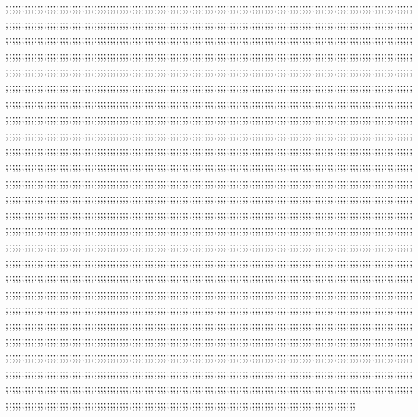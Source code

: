 ;;;;;;;;;;;;;;;;;;;;;;;;;;;;;;;;;;;;;;;;;;;;;;;;;;;;;;;;;;;;;;;;;;;;;;;;;;;;;;;;;;;;;;;;;;;;;;;;;;;;;;;;;;;;;;;;;;;;;;;;;;;;;;;;;;;;;;;;;;;;;;;;;;;;;;;;;;;;;;;;;;;;;;;;;;;;;;;;;;;;;;;;;;;;;;;;;;;;;;;;;;;;;;;;;;;;;;;;;;;;;;;;;;;;;;;;;;;;;;;;;;;;;;;;;;;;;;;;;;;;;;;;;;;;;;;;;;;;;;;;;;;;;;;;;;;;;;;;;;;;;;;;;;;;;;;;;;;;;;;;;;;;;;;;;;;;;;;;;;;;;;;;;;;;;;;;;;;;;;;;;;;;;;;;;;;;;;;;;;;;;;;;;;;;;;;;;;;;;;;;;;;;;;;;;;;;;;;;;;;;;;;;;;;;;;;;;;;;;;;;;;;;;;;;;;;;;;;;;;;;;;;;;;;;;;;;;;;;;;;;;;;;;;;;;;;;;;;;;;;;;;;;;;;;;;;;;;;;;;;;;;;;;;;;;;;;;;;;;;;;;;;;;;;;;;;;;;;;;;;;;;;;;;;;;;;;;;;;;;;;;;;;;;;;;;;;;;;;;;;;;;;;;;;;;;;;;;;;;;;;;;;;;;;;;;;;;;;;;;;;;;;;;;;;;;;;;;;;;;;;;;;;;;;;;;;;;;;;;;;;;;;;;;;;;;;;;;;;;;;;;;;;;;;;;;;;;;;;;;;;;;;;;;;;;;;;;;;;;;;;;;;;;;;;;;;;;;;;;;;;;;;;;;;;;;;;;;;;;;;;;;;;;;;;;;;;;;;;;;;;;;;;;;;;;;;;;;;;;;;;;;;;;;;;;;;;;;;;;;;;;;;;;;;;;;;;;;;;;;;;;;;;;;;;;;;;;;;;;;;;;;;;;;;;;;;;;;;;;;;;;;;;;;;;;;;;;;;;;;;;;;;;;;;;;;;;;;;;;;;;;;;;;;;;;;;;;;;;;;;;;;;;;;;;;;;;;;;;;;;;;;;;;;;;;;;;;;;;;;;;;;;;;;;;;;;;;;;;;;;;;;;;;;;;;;;;;;;;;;;;;;;;;;;;;;;;;;;;;;;;;;;;;;;;;;;;;;;;;;;;;;;;;;;;;;;;;;;;;;;;;;;;;;;;;;;;;;;;;;;;;;;;;;;;;;;;;;;;;;;;;;;;;;;;;;;;;;;;;;;;;;;;;;;;;;;;;;;;;;;;;;;;;;;;;;;;;;;;;;;;;;;;;;;;;;;;;;;;;;;;;;;;;;;;;;;;;;;;;;;;;;;;;;;;;;;;;;;;;;;;;;;;;;;;;;;;;;;;;;;;;;;;;;;;;;;;;;;;;;;;;;;;;;;;;;;;;;;;;;;;;;;;;;;;;;;;;;;;;;;;;;;;;;;;;;;;;;;;;;;;;;;;;;;;;;;;;;;;;;;;;;;;;;;;;;;;;;;;;;;;;;;;;;;;;;;;;;;;;;;;;;;;;;;;;;;;;;;;;;;;;;;;;;;;;;;;;;;;;;;;;;;;;;;;;;;;;;;;;;;;;;;;;;;;;;;;;;;;;;;;;;;;;;;;;;;;;;;;;;;;;;;;;;;;;;;;;;;;;;;;;;;;;;;;;;;;;;;;;;;;;;;;;;;;;;;;;;;;;;;;;;;;;;;;;;;;;;;;;;;;;;;;;;;;;;;;;;;;;;;;;;;;;;;;;;;;;;;;;;;;;;;;;;;;;;;;;;;;;;;;;;;;;;;;;;;;;;;;;;;;;;;;;;;;;;;;;;;;;;;;;;;;;;;;;;;;;;;;;;;;;;;;;;;;;;;;;;;;;;;;;;;;;;;;;;;;;;;;;;;;;;;;;;;;;;;;;;;;;;;;;;;;;;;;;;;;;;;;;;;;;;;;;;;;;;;;;;;;;;;;;;;;;;;;;;;;;;;;;;;;;;;;;;;;;;;;;;;;;;;;;;;;;;;;;;;;;;;;;;;;;;;;;;;;;;;;;;;;;;;;;;;;;;;;;;;;;;;;;;;;;;;;;;;;;;;;;;;;;;;;;;;;;;;;;;;;;;;;;;;;;;;;;;;;;;;;;;;;;;;;;;;;;;;;;;;;;;;;;;;;;;;;;;;;;;;;;;;;;;;;;;;;;;;;;;;;;;;;;;;;;;;;;;;;;;;;;;;;;;;;;;;;;;;;;;;;;;;;;;;;;;;;;;;;;;;;;;;;;;;;;;;;;;;;;;;;;;;;;;;;;;;;;;;;;;;;;;;;;;;;;;;;;;;;;;;;;;;;;;;;;;;;;;;;;;;;;;;;;;;;;;;;;;;;;;;;;;;;;;;;;;;;;;;;;;;;;;;;;;;;;;;;;;;;;;;;;;;;;;;;;;;;;;;;;;;;;;;;;;;;;;;;;;;;;;;;;;;;;;;;;;;;;;;;;;;;;;;;;;;;;;;;;;;;;;;;;;;;;;;;;;;;;;;;;;;;;;;;;;;;;;;;;;;;;;;;;;;;;;;;;;;;;;;;;;;;;;;;;;;;;;;;;;;;;;;;;;;;;;;;;;;;;;;;;;;;;;;;;;;;;;;;;;;;;;;;;;;;;;;;;;;;;;;;;;;;;;;;;;;;;;;;;;;;;;;;;;;;;;;;;;;;;;;;;;;;;;;;;;;;;;;;;;;;;;;;;;;;;;;;;;;;;;;;;;;;;;;;;;;;;;;;;;;;;;;;;;;;;;;;;;;;;;;;;;;;;;;;;;;;;;;;;;;;;;;;;;;;;;;;;;;;;;;;;;;;;;;;;;;;;;;;;;;;;;;;;;;;;;;;;;;;;;;;;;;;;;;;;;;;;;;;;;;;;;;;;;;;;;;;;;;;;;;;;;;;;;;;;;;;;;;;;;;;;;;;;;;;;;;;;;;;;;;;;;;;;;;;;;;;;;;;;;;;;;;;;;;;;;;;;;;;;;;;;;;;;;;;;;;;;;;;;;;;;;;;;;;;;;;;;;;;;;;;;;;;;;;;;;;;;;;;;;;;;;;;;;;;;;;;;;;;;;;;;;;;;;;;;;;;;;;;;;;;;;;;;;;;;;;;;;;;;;;;;;;;;;;;;;;;;;;;;;;;;;;;;;;;;;;;;;;;;;;;;;;;;;;;;;;;;;;;;;;;;;;;;;;;;;;;;;;;;;;;;;;;;;;;;;;;;;;;;;;;;;;;;;;;;;;;;;;;;;;;;;;;;;;;;;;;;;;;;;;;;;;;;;;;;;;;;;;;;;;;;;;;;;;;;;;;;;;;;;;;;;;;;;;;;;;;;;;;;;;;;;;;;;;;;;;;;;;;;;;;;;;;;;;;;;;;;;;;;;;;;;;;;;;;;;;;;;;;;;;;;;;;;;;;;;;;;;;;;;;;;;;;;;;;;;;;;;;;;;;;;;;;;;;;;;;;;;;;;;;;;;;;;;;;;;;;;;;;;;;;;;;;;;;;;;;;;;;;;;;;;;;;;;;;;;;;;;;;;;;;;;;;;;;;;;;;;;;;;;;;;;;;;;;;;;;;;;;;;;;;;;;;;;;;;;;;;;;;;;;;;;;;;;;;